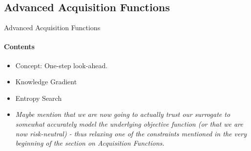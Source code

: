 \subsection{Advanced Acquisition Functions}
\begin{frame}[c]{Advanced Acquisition Functions}
\framesubtitle{Contents}
\pause
\begin{itemize}
    \item Concept: One-step look-ahead.
    \item Knowledge Gradient
    \item Entropy Search
    \item \emph{Maybe mention that we are now going to actually trust our surrogate to somewhat accurately model the underlying objective function (or that we are now risk-neutral) - thus relaxing one of the constraints mentioned in the very beginning of the section on Acquisition Functions.}
\end{itemize}
\end{frame}


